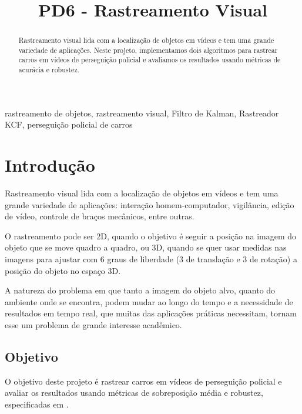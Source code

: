 \documentclass[conference]{IEEEtran}
\begin{document}
\title{PD6 - Rastreamento Visual}

\author{
}

\maketitle

\begin{abstract}
Rastreamento visual lida com a localização de objetos em vídeos e tem uma grande variedade de aplicações. Neste projeto, implementamos dois algoritmos para rastrear carros em vídeos de perseguição policial e avaliamos os resultados usando métricas de acurácia e robustez.
\end{abstract}

\begin{IEEEkeywords}
rastreamento de objetos, rastreamento visual, Filtro de Kalman, Rastreador KCF, perseguição policial de carros
\end{IEEEkeywords}

\section{Introdução}

Rastreamento visual lida com a localização de objetos em vídeos e tem uma grande variedade de aplicações: interação homem-computador, vigilância, edição de vídeo, controle de braços mecânicos, entre outras\cite{wikipedia}. 

O rastreamento pode ser 2D, quando o objetivo é seguir a posição na imagem do objeto que se move quadro a quadro, ou 3D, quando se quer usar medidas nas imagens para ajustar com 6 graus de liberdade (3 de translação e 3 de rotação) a posição do objeto no espaço 3D. 

A natureza do problema em que tanto a imagem do objeto alvo, quanto do ambiente onde se encontra,  podem mudar ao longo do tempo e a necessidade de resultados em tempo real, que muitas das aplicações práticas necessitam, tornam esse um problema de grande interesse acadêmico. 

\subsection{Objetivo}
O objetivo deste projeto é rastrear carros em vídeos de perseguição policial e avaliar os resultados usando métricas de sobreposição média e robustez, especificadas em \cite{cehovin}.
\end{document}
